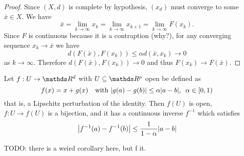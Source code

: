 \documentclass[12pt]{extarticle}
\begin{document}
\begin{proof}
    Since $(X, d)$ is complete by hypothesis, $(x_d)$ must converge to some $\bar x \in X$.
    We have
    \begin{equation}
        \bar x = \lim_{k \to \infty} x_k = \lim_{k \to \infty} x_{k + 1} = \lim_{k \to \infty} F(x_k).
    \end{equation}
    Since $F$ is continuous because it is a contraption (why?), for any converging sequence $x_k \to \bar x$ we have
    \begin{equation}
        d(F(\bar x), F(x_k)) \leq \alpha d(\bar x, x_k) \to 0
    \end{equation}
    as $k \to \infty$.
    Therefore $d(F(\bar x), F(x_k)) \to 0$ and thus $F(x_k) \to F(\bar x)$.
\end{proof}

\begin{theorem}{}{}
    Let $f: U \to \R^d$ with $U \subseteq \R^p$ open be defined as
    \begin{equation}
        f(x) = x + g(x) \quad \text{with } \abs{g(a) - g(b)} \leq \alpha \abs{a - b}, \enspace \alpha \in [0,1)
    \end{equation}
    that is, a Lipschitz perturbation of the identity.
    Then $f(U)$ is open, $f: U \to f(U)$ is a bijection, and it has a continuous inverse $f^{-1}$
    which satisfies
    \begin{equation}
        \abs{f^{-1}(a)- f^{-1}(b)} \leq \frac{1}{1-\alpha} \abs{a-b}
    \end{equation}
\end{theorem}

TODO: there is a weird corollary here, but f it.
\end{document}
